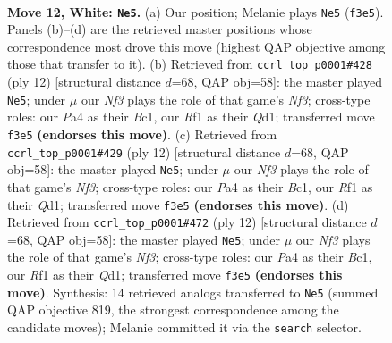 \documentclass[11pt]{article}
\begin{document}
\clearpage

\begin{figure}[p]\centering
\begin{subfigure}{0.46\textwidth}\centering
\resizebox{\linewidth}{!}{%
\newchessgame
\chessboard[
  setfen={rnbqkb1r/5p2/1p2pnp1/p6p/P2P4/1BN2N1P/1P3PP1/R1BQ1RK1 w kq - 0 12},
  showmover=false,
  pgfstyle=straightmove, color=movearrow, markmove={f3-e5}
]}
\caption{}
\end{subfigure}\hfill
\begin{subfigure}{0.46\textwidth}\centering
\resizebox{\linewidth}{!}{%
\newchessgame
\chessboard[
  setfen={rnbqkb1r/p4ppp/2p1pn2/1p6/2pP4/2N2NP1/PP2PPBP/R1BQK2R w KQkq - 0 7},
  showmover=false,
  pgfstyle=straightmove, color=movearrow, markmove={f3-e5}
]}
\caption{}
\end{subfigure}
\\[4pt]
\begin{subfigure}{0.46\textwidth}\centering
\resizebox{\linewidth}{!}{%
\newchessgame
\chessboard[
  setfen={rnbqkb1r/p4ppp/2p1pn2/1p6/2pP4/2N2NP1/PP2PPBP/R1BQK2R w KQkq - 0 7},
  showmover=false,
  pgfstyle=straightmove, color=movearrow, markmove={f3-e5}
]}
\caption{}
\end{subfigure}\hfill
\begin{subfigure}{0.46\textwidth}\centering
\resizebox{\linewidth}{!}{%
\newchessgame
\chessboard[
  setfen={rnbqkb1r/p4ppp/2p1pn2/1p6/2pP4/2N2NP1/PP2PPBP/R1BQK2R w KQkq - 0 7},
  showmover=false,
  pgfstyle=straightmove, color=movearrow, markmove={f3-e5}
]}
\caption{}
\end{subfigure}
\caption{\textbf{Move 12, White: \texttt{Ne5}.} (a) Our position; Melanie plays \texttt{Ne5} (\texttt{f3e5}). Panels (b)--(d) are the retrieved master positions whose correspondence most drove this move (highest QAP objective among those that transfer to it). (b) Retrieved from \texttt{ccrl\_top\_p0001\#428} (ply 12) [structural distance $d$=68, QAP obj=58]: the master played \texttt{Ne5}; under $\mu$ our \emph{Nf3} plays the role of that game's \emph{Nf3}; cross-type roles: our \emph{P}a4 as their \emph{B}c1, our \emph{R}f1 as their \emph{Q}d1; transferred move \texttt{f3e5} \textbf{(endorses this move)}. (c) Retrieved from \texttt{ccrl\_top\_p0001\#429} (ply 12) [structural distance $d$=68, QAP obj=58]: the master played \texttt{Ne5}; under $\mu$ our \emph{Nf3} plays the role of that game's \emph{Nf3}; cross-type roles: our \emph{P}a4 as their \emph{B}c1, our \emph{R}f1 as their \emph{Q}d1; transferred move \texttt{f3e5} \textbf{(endorses this move)}. (d) Retrieved from \texttt{ccrl\_top\_p0001\#472} (ply 12) [structural distance $d$=68, QAP obj=58]: the master played \texttt{Ne5}; under $\mu$ our \emph{Nf3} plays the role of that game's \emph{Nf3}; cross-type roles: our \emph{P}a4 as their \emph{B}c1, our \emph{R}f1 as their \emph{Q}d1; transferred move \texttt{f3e5} \textbf{(endorses this move)}. Synthesis: 14 retrieved analogs transferred to \texttt{Ne5} (summed QAP objective 819, the strongest correspondence among the candidate moves); Melanie committed it via the \texttt{search} selector.}
\label{fig:thought-m22}
\end{figure}
\end{document}
